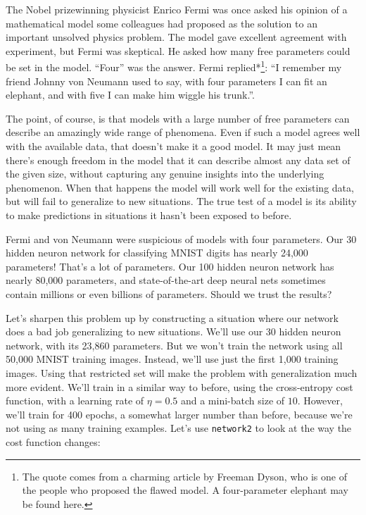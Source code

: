 

The Nobel prizewinning physicist Enrico Fermi was once asked his opinion of a mathematical model some colleagues had proposed as the solution to an important unsolved physics problem. The model gave excellent agreement with experiment, but Fermi was skeptical. He asked how many free parameters could be set in the model. ``Four'' was the answer. Fermi replied*\footnote{The quote comes from a charming article by Freeman Dyson, who is one of the people who proposed the flawed model. A four-parameter elephant may be found here.}: ``I remember my friend Johnny von Neumann used to say, with four parameters I can fit an elephant, and with five I can make him wiggle his trunk.''.


The point, of course, is that models with a large number of free parameters can describe an amazingly wide range of phenomena. Even if such a model agrees well with the available data, that doesn't make it a good model. It may just mean there's enough freedom in the model that it can describe almost any data set of the given size, without capturing any genuine insights into the underlying phenomenon. When that happens the model will work well for the existing data, but will fail to generalize to new situations. The true test of a model is its ability to make predictions in situations it hasn't been exposed to before.


Fermi and von Neumann were suspicious of models with four parameters. Our 30 hidden neuron network for classifying MNIST digits has nearly 24,000 parameters! That's a lot of parameters. Our 100 hidden neuron network has nearly 80,000 parameters, and state-of-the-art deep neural nets sometimes contain millions or even billions of parameters. Should we trust the results?


Let's sharpen this problem up by constructing a situation where our network does a bad job generalizing to new situations. We'll use our 30 hidden neuron network, with its 23,860 parameters. But we won't train the network using all 50,000 MNIST training images. Instead, we'll use just the first 1,000 training images. Using that restricted set will make the problem with generalization much more evident. We'll train in a similar way to before, using the cross-entropy cost function, with a learning rate of $\eta = 0.5$ and a mini-batch size of $10$. However, we'll train for 400 epochs, a somewhat larger number than before, because we're not using as many training examples. Let's use \texttt{network2} to look at the way the cost function changes:



